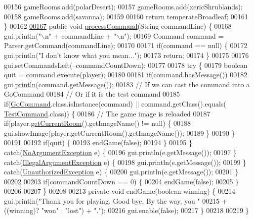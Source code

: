 \begin{DoxyCode}
00156         gameRooms.add(polarDesert);
00157         gameRooms.add(xericShrublands);
00158         gameRooms.add(savanna);
00159 
00160         \textcolor{keywordflow}{return} temperateBroadleaf;
00161     \}
00162 
\hypertarget{GameEngine_8java_source_l00167}{}\hyperlink{classGameEngine_ad7133885f313fa99bca3bb7cb8272f64}{00167}     \textcolor{keyword}{public} \textcolor{keywordtype}{void} \hyperlink{classGameEngine_ad7133885f313fa99bca3bb7cb8272f64}{processCommand}(String commandLine) \{
00168         gui.println(\textcolor{stringliteral}{"\(\backslash\)n"} + commandLine + \textcolor{stringliteral}{"\(\backslash\)n"});
00169         Command command = Parser.getCommand(commandLine);
00170 
00171         \textcolor{keywordflow}{if}(command == null) \{
00172             gui.println(\textcolor{stringliteral}{"I don't know what you mean..."});
00173             \textcolor{keywordflow}{return};
00174         \}
00175 
00176         gui.setCommandsLeft(--commandCountDown);
00177 
00178         \textcolor{keywordflow}{try} \{
00179             \textcolor{keywordtype}{boolean} quit = command.execute(player);
00180 
00181             \textcolor{keywordflow}{if}(command.hasMessage())
00182                 gui.\hyperlink{classUserInterface_a79f606b4b1f5d1523e50eea00039ed94}{println}(command.getMessage());
00183             \textcolor{comment}{// If we can cast the command into a GoCommand}
00184             \textcolor{comment}{// Or if it is the test command}
00185             \textcolor{keywordflow}{if}(\hyperlink{classGoCommand}{GoCommand}.class.isInstance(command) || command.getClass().equals(
      \hyperlink{classTestCommand}{TestCommand}.class)) \{
00186                 \textcolor{comment}{// The game image is reloaded}
00187                 \textcolor{keywordflow}{if}(player.\hyperlink{classPlayer_a3a3107df50fc4e35e8c0f46c3f776ce6}{getCurrentRoom}().getImageName() != null) \{
00188                     gui.showImage(player.getCurrentRoom().getImageName());
00189                 \}
00190             \}
00191 
00192             \textcolor{keywordflow}{if}(quit) \{
00193                 endGame(\textcolor{keyword}{false});
00194             \}
00195         \} \textcolor{keywordflow}{catch}(\hyperlink{classNoArgumentException}{NoArgumentException} e) \{
00196             gui.println(e.getMessage());
00197         \} \textcolor{keywordflow}{catch}(\hyperlink{classIllegalArgumentException}{IllegalArgumentException} e) \{
00198             gui.println(e.getMessage());
00199         \} \textcolor{keywordflow}{catch}(\hyperlink{classUnauthorizedException}{UnauthorizedException} e) \{
00200             gui.println(e.getMessage());
00201         \}
00202 
00203         \textcolor{keywordflow}{if}(commandCountDown == 0) \{
00204             endGame(\textcolor{keyword}{false});
00205         \}
00206 
00207     \}
00208 
00213     \textcolor{keyword}{private} \textcolor{keywordtype}{void} endGame(\textcolor{keywordtype}{boolean} winning) \{
00214         gui.println(\textcolor{stringliteral}{"Thank you for playing. Good bye. By the way, you "}
00215                 + ((winning)? \textcolor{stringliteral}{"won"} : \textcolor{stringliteral}{"lost"}) + \textcolor{stringliteral}{"."});
00216         gui.enable(\textcolor{keyword}{false});
00217     \}
00218 
00219 \}
\end{DoxyCode}
